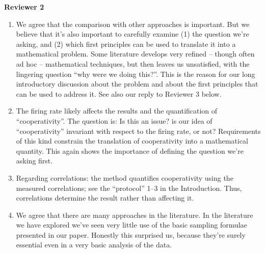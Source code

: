 \documentclass{article}
\begin{document}
\textbf{Reviewer 2}
\begin{enumerate}
\item We agree that the comparison with other approaches is important. But
  we believe that it's also important to carefully examine (1) the question
  we're asking, and (2) which first principles can be used to translate it
  into a mathematical problem. Some literature develops very refined --
  though often ad hoc -- mathematical techniques, but then leaves us
  unsatisfied, with the lingering question \enquote{why were we doing
    this?}. This is the reason for our long introductory discussion about
  the problem and about the first principles that can be used to address
  it. See also our reply to Reviewer 3 below.
\item The firing rate likely affects the results and the quantification of
  \enquote{cooperativity}. The question is: Is this an issue? is our idea
  of \enquote{cooperativity} invariant with respect to the firing rate, or
  not? Requirements of this kind constrain the translation of cooperativity
  into a mathematical quantity. This again shows the importance of defining
  the question we're asking first.
\item Regarding correlations: the method quantifies cooperativity using the
  measured correlations; see the \enquote{protocol} 1--3 in the
  Introduction. Thus, correlations determine the result rather than
  affecting it.
\item We agree that there are many approaches in the literature. In the
  literature we have explored we've seen very little use of the basic
  sampling formulae presented in our paper. Honestly this surprised us,
  because they're surely essential even in a very basic analysis of the data.
\end{enumerate}

\bigskip
\end{document}
